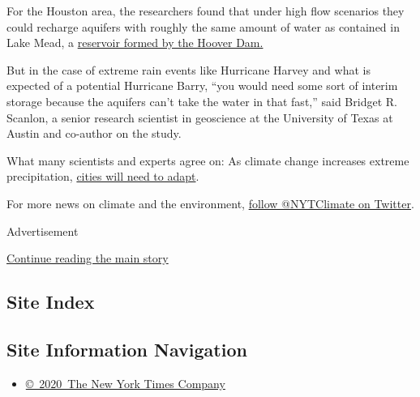 For the Houston area, the researchers found that under high flow
scenarios they could recharge aquifers with roughly the same amount of
water as contained in Lake Mead, a
\href{https://www.nytimes.com/2019/03/19/climate/colorado-river-water.html}{reservoir
formed by the Hoover Dam.}

But in the case of extreme rain events like Hurricane Harvey and what is
expected of a potential Hurricane Barry, ``you would need some sort of
interim storage because the aquifers can't take the water in that
fast,'' said Bridget R. Scanlon, a senior research scientist in
geoscience at the University of Texas at Austin and co-author on the
study.

What many scientists and experts agree on: As climate change increases
extreme precipitation,
\href{https://www.nytimes.com/2019/06/19/climate/seawalls-cities-cost-climate-change.html}{cities
will need to adapt}.

For more news on climate and the environment,
\href{https://twitter.com/nytclimate}{follow @NYTClimate on Twitter}.

Advertisement

\protect\hyperlink{after-bottom}{Continue reading the main story}

\hypertarget{site-index}{%
\subsection{Site Index}\label{site-index}}

\hypertarget{site-information-navigation}{%
\subsection{Site Information
Navigation}\label{site-information-navigation}}

\begin{itemize}
\tightlist
\item
  \href{https://help.nytimes.com/hc/en-us/articles/115014792127-Copyright-notice}{©~2020~The
  New York Times Company}
\end{itemize}

